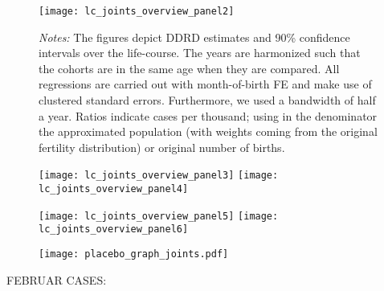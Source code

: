 \begin{landscape}
\begin{figure}[H]
\centering
\begin{minipage}{.9\linewidth}
\texttt{[image: lc\_joints\_overview\_panel2]}
{\scriptsize \emph{Notes:} The figures depict DDRD estimates and 90\% confidence intervals over the life-course. The years are harmonized such that the cohorts are in the same age when they are compared. All regressions are carried out with month-of-birth FE and make use of clustered standard errors. Furthermore, we used a bandwidth of half a year. Ratios indicate cases per thousand; using in the denominator the approximated population (with weights coming from the original fertility distribution) or original number of births. \par}
\end{minipage}
\end{figure}
\end{landscape}
\begin{figure}[H]%
	\centering
	\texttt{[image: lc\_joints\_overview\_panel3]}
	\texttt{[image: lc\_joints\_overview\_panel4]}
\end{figure}
\begin{figure}[H]
	\centering	
	\texttt{[image: lc\_joints\_overview\_panel5]}
	\texttt{[image: lc\_joints\_overview\_panel6]}
\end{figure}
%
\begin{figure}[H]%
	\centering
	\texttt{[image: placebo\_graph\_joints.pdf]}
\end{figure}




%
FEBRUAR CASES:



